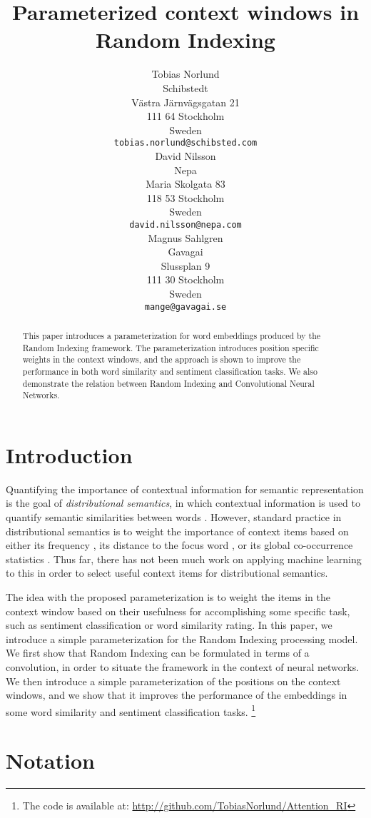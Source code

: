 \documentclass[11pt]{article}
\title{Parameterized context windows in Random Indexing}
\author{Tobias Norlund \\
	Schibstedt \\
    Västra Järnvägsgatan 21 \\
    111 64 Stockholm \\
    Sweden \\
	{\tt tobias.norlund@schibsted.com} \\\And
    David Nilsson \\
    Nepa \\
    Maria Skolgata 83 \\
    118 53 Stockholm \\
    Sweden \\
    {\tt david.nilsson@nepa.com} \\\And
    Magnus Sahlgren \\
  	Gavagai \\
  	Slussplan 9 \\
  	111 30 Stockholm \\
  	Sweden \\
  	{\tt mange@gavagai.se}}
\date{}
\begin{document}
\maketitle
\begin{abstract}
This paper introduces a parameterization for word embeddings produced by the Random Indexing framework. The parameterization introduces position specific weights in the context windows, and the approach is shown to improve the performance in both word similarity and sentiment classification tasks. We also demonstrate the relation between Random Indexing and Convolutional Neural Networks.
\end{abstract}

\section{Introduction}

Quantifying the importance of contextual information for semantic representation is the goal of {\em distributional semantics}, in which contextual information is used to quantify semantic similarities between words \cite{Turney:Pantel:2010}. However, standard practice in distributional semantics is to weight the importance of context items based on either its frequency \cite{Sahlgren:2016}, its distance to the focus word \cite{Lund:1995}, or its global co-occurrence statistics \cite{Niwa:1994}. Thus far, there has not been much work on applying machine learning to this in order to select useful context items for distributional semantics.

The idea with the proposed parameterization is to weight the items in the context window based on their usefulness for accomplishing some specific task, such as sentiment classification or word similarity rating. In this paper, we introduce a simple parameterization for the Random Indexing processing model. We first show that Random Indexing can be formulated in terms of a convolution, in order to situate the framework in the context of neural networks.
We then introduce a simple parameterization of the positions on the context windows, and we show that it improves the performance of the embeddings in some word similarity and sentiment classification tasks. \footnote{The code is available at: \url{http://github.com/TobiasNorlund/Attention_RI}}

\section{Notation}
\end{document}
